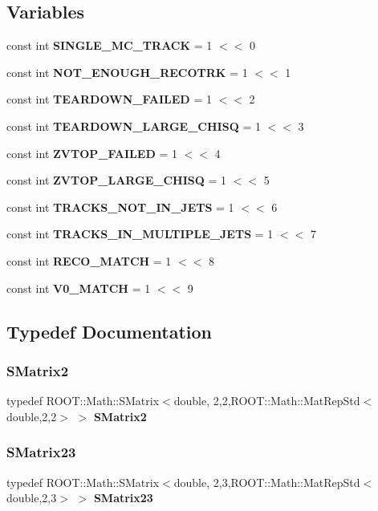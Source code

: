 \subsection*{Variables}
\begin{DoxyCompactItemize}
\item 
const int \textbf{ S\+I\+N\+G\+L\+E\+\_\+\+M\+C\+\_\+\+T\+R\+A\+CK} = 1 $<$$<$ 0
\item 
const int \textbf{ N\+O\+T\+\_\+\+E\+N\+O\+U\+G\+H\+\_\+\+R\+E\+C\+O\+T\+RK} = 1 $<$$<$ 1
\item 
const int \textbf{ T\+E\+A\+R\+D\+O\+W\+N\+\_\+\+F\+A\+I\+L\+ED} = 1 $<$$<$ 2
\item 
const int \textbf{ T\+E\+A\+R\+D\+O\+W\+N\+\_\+\+L\+A\+R\+G\+E\+\_\+\+C\+H\+I\+SQ} = 1 $<$$<$ 3
\item 
const int \textbf{ Z\+V\+T\+O\+P\+\_\+\+F\+A\+I\+L\+ED} = 1 $<$$<$ 4
\item 
const int \textbf{ Z\+V\+T\+O\+P\+\_\+\+L\+A\+R\+G\+E\+\_\+\+C\+H\+I\+SQ} = 1 $<$$<$ 5
\item 
const int \textbf{ T\+R\+A\+C\+K\+S\+\_\+\+N\+O\+T\+\_\+\+I\+N\+\_\+\+J\+E\+TS} = 1 $<$$<$ 6
\item 
const int \textbf{ T\+R\+A\+C\+K\+S\+\_\+\+I\+N\+\_\+\+M\+U\+L\+T\+I\+P\+L\+E\+\_\+\+J\+E\+TS} = 1 $<$$<$ 7
\item 
const int \textbf{ R\+E\+C\+O\+\_\+\+M\+A\+T\+CH} = 1 $<$$<$ 8
\item 
const int \textbf{ V0\+\_\+\+M\+A\+T\+CH} = 1 $<$$<$ 9
\end{DoxyCompactItemize}


\subsection{Typedef Documentation}
\mbox{\label{Driver_8cc_a59c4f66f8955c2a49e2283a47a143b64}} 
\subsubsection{S\+Matrix2}
{\footnotesize\ttfamily typedef R\+O\+O\+T\+::\+Math\+::\+S\+Matrix$<$double, 2,2,R\+O\+O\+T\+::\+Math\+::\+Mat\+Rep\+Std$<$double,2,2$>$ $>$ \textbf{ S\+Matrix2}}

\mbox{\label{Driver_8cc_a72895daca02ecd6fee17a5687bf19ae8}} 
\subsubsection{S\+Matrix23}
{\footnotesize\ttfamily typedef R\+O\+O\+T\+::\+Math\+::\+S\+Matrix$<$double, 2,3,R\+O\+O\+T\+::\+Math\+::\+Mat\+Rep\+Std$<$double,2,3$>$ $>$ \textbf{ S\+Matrix23}}

